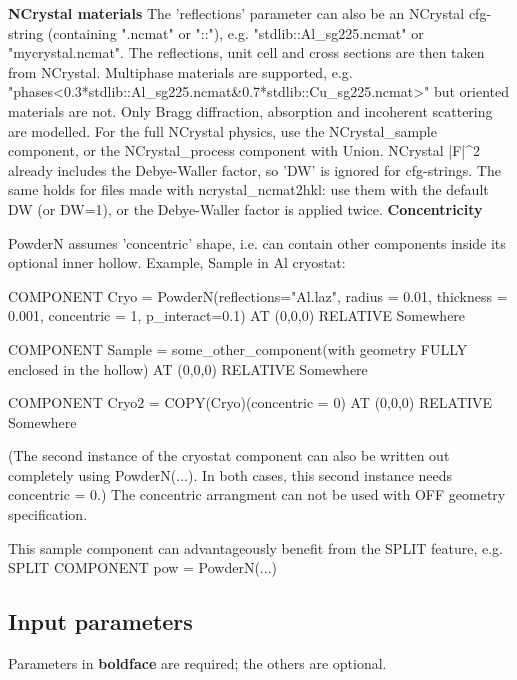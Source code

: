 \textbf{NCrystal materials} The 'reflections' parameter can also be an NCrystal cfg-string (containing ".ncmat" or "::"), e.g. "stdlib::Al\_sg225.ncmat" or "mycrystal.ncmat". The reflections, unit cell and cross sections are then taken from NCrystal. Multiphase materials are supported, e.g. "phases\textless{}0.3*stdlib::Al\_sg225.ncmat\&0.7*stdlib::Cu\_sg225.ncmat\textgreater{}" but oriented materials are not. Only Bragg diffraction, absorption and incoherent scattering are modelled. For the full NCrystal physics, use the NCrystal\_sample component, or the NCrystal\_process component with Union. NCrystal |F|\textasciicircum{}2 already includes the Debye-Waller factor, so 'DW' is ignored for cfg-strings. The same holds for files made with ncrystal\_ncmat2hkl: use them with the default DW (or DW=1), or the Debye-Waller factor is applied twice. \textbf{Concentricity}

PowderN assumes 'concentric' shape, i.e. can contain other components inside its optional inner hollow. Example, Sample in Al cryostat:

COMPONENT Cryo = PowderN(reflections="Al.laz", radius = 0.01, thickness = 0.001, concentric = 1, p\_interact=0.1) AT (0,0,0) RELATIVE Somewhere

COMPONENT Sample = some\_other\_component(with geometry FULLY enclosed in the hollow) AT (0,0,0) RELATIVE Somewhere

COMPONENT Cryo2 = COPY(Cryo)(concentric = 0) AT (0,0,0) RELATIVE Somewhere

(The second instance of the cryostat component can also be written out completely using PowderN(...). In both cases, this second instance needs concentric = 0.) The concentric arrangment can not be used with OFF geometry specification.

This sample component can advantageously benefit from the SPLIT feature, e.g. SPLIT COMPONENT pow = PowderN(...)

\subsection*{Input parameters}
Parameters in \textbf{boldface} are required; the others are optional.


